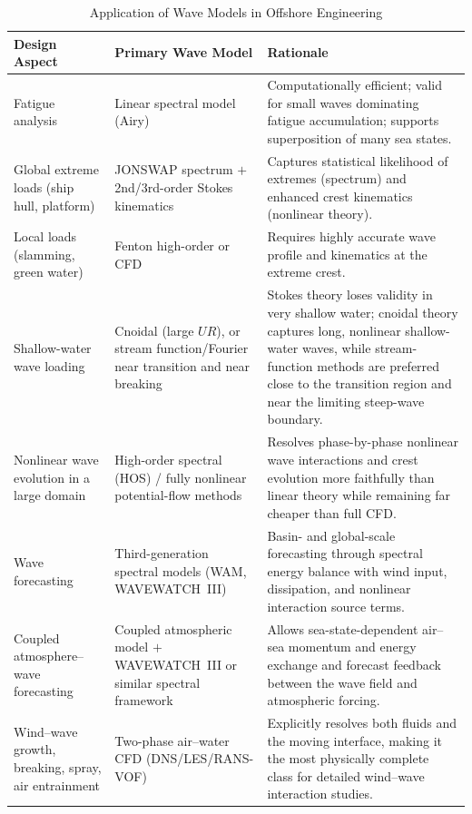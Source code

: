 \documentclass[journal,10pt,twocolumn]{IEEEtran}
\begin{document}
\begin{table}[t]
  \centering
  \caption{Application of Wave Models in Offshore Engineering}
  \label{tab:industrial}
  \small
  \begin{tabular}{@{}L{2.8cm}L{6.5cm}L{3.5cm}@{}}
    \toprule
    Design Aspect & Primary Wave Model & Rationale \\
    \midrule
    Fatigue analysis
      & Linear spectral model (Airy)
      & Computationally efficient; valid for small waves dominating fatigue
        accumulation; supports superposition of many sea states. \\[4pt]
    Global extreme loads (ship hull, platform)
      & JONSWAP spectrum $+$ 2nd/3rd-order Stokes kinematics
      & Captures statistical likelihood of extremes (spectrum) and enhanced crest
        kinematics (nonlinear theory). \\[4pt]
    Local loads (slamming, green water)
      & Fenton high-order or CFD
      & Requires highly accurate wave profile and kinematics at the extreme crest. \\[4pt]
    Shallow-water wave loading
      & Cnoidal (large $UR$), or stream function/Fourier near transition and near breaking
      & Stokes theory loses validity in very shallow water; cnoidal theory captures long,
        nonlinear shallow-water waves, while stream-function methods are preferred close
        to the transition region and near the limiting steep-wave boundary. \\[4pt]
    Nonlinear wave evolution in a large domain
      & High-order spectral (HOS) / fully nonlinear potential-flow methods
      & Resolves phase-by-phase nonlinear wave interactions and crest evolution more
        faithfully than linear theory while remaining far cheaper than full CFD. \\[4pt]
    Wave forecasting
      & Third-generation spectral models (WAM, WAVEWATCH~III)
      & Basin- and global-scale forecasting through spectral energy balance with wind
        input, dissipation, and nonlinear interaction source terms. \\[4pt]
    Coupled atmosphere--wave forecasting
      & Coupled atmospheric model $+$ WAVEWATCH~III or similar spectral framework
      & Allows sea-state-dependent air--sea momentum and energy exchange and forecast
        feedback between the wave field and atmospheric forcing. \\[4pt]
    Wind--wave growth, breaking, spray, air entrainment
      & Two-phase air--water CFD (DNS/LES/RANS-VOF)
      & Explicitly resolves both fluids and the moving interface, making it the most
        physically complete class for detailed wind--wave interaction studies. \\
    \bottomrule
  \end{tabular}
\end{table}
\end{document}

